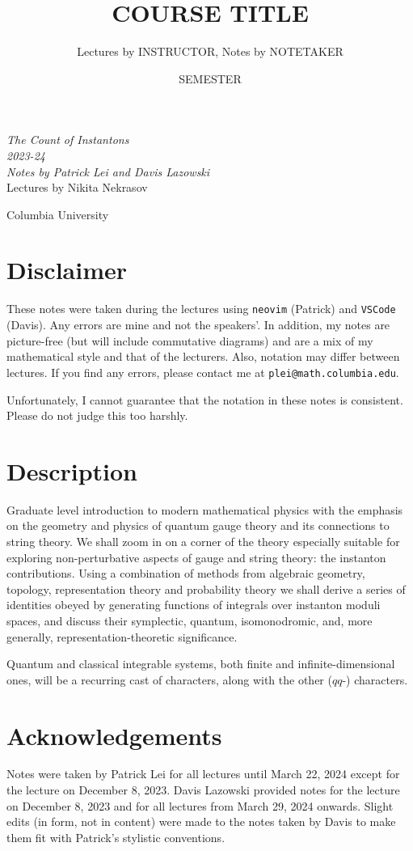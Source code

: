 \documentclass[leqno, openany]{memoir}
\title{COURSE TITLE}
\author{Lectures by INSTRUCTOR, Notes by NOTETAKER}
\date{SEMESTER}
\theoremstyle{definition}
\theoremstyle{remark}
\theoremstyle{plain}
\theoremstyle{definition}
\theoremstyle{remark}
\newcommand*{\titleSW}
    {\begingroup%
    \raggedleft
    \vspace*{\baselineskip}
    {\Huge\itshape The Count of Instantons \\ 2023-24}\\[\baselineskip]
    {\large\itshape Notes by Patrick Lei and Davis Lazowski}\\[0.2\textheight]
    {\Large Lectures by Nikita Nekrasov}\par
    \vfill
    {\Large \sffamily Columbia University}
    \vspace*{\baselineskip}
\endgroup}
\begin{document}
    
\begin{titlingpage}
\titleSW
\end{titlingpage}

\thispagestyle{empty}
\section*{Disclaimer}%
\label{sec:disclaimer}

These notes were taken during the lectures using \texttt{neovim} (Patrick) and \texttt{VSCode} (Davis). 
Any errors are mine and not the speakers'. 
In addition, my notes are picture-free (but will include commutative diagrams) and are a mix of my mathematical style and that of the lecturers. Also, notation may differ between lectures.
If you find any errors, please contact me at \texttt{plei@math.columbia.edu}.

Unfortunately, I cannot guarantee that the notation in these notes is consistent. Please do not judge this too harshly.

\section*{Description}

Graduate level introduction to modern mathematical physics with the emphasis on the geometry and physics of quantum gauge theory and its connections to string theory.  We shall zoom in on a corner of the theory especially suitable for exploring non-perturbative aspects of gauge and string theory: the instanton contributions. Using a combination of methods from algebraic geometry, topology, representation theory and probability theory we shall derive a series of identities obeyed by generating functions of integrals over instanton moduli spaces, and discuss their symplectic, quantum, isomonodromic, and, more generally, representation-theoretic significance.

Quantum and classical integrable systems, both finite and infinite-dimensional ones, will be a recurring cast of characters, along with the other ($qq$-) characters.

\section*{Acknowledgements}
Notes were taken by Patrick Lei for all lectures until March 22, 2024 except for the lecture on December 8, 2023. Davis Lazowski provided notes for the lecture on December 8, 2023 and for all lectures from March 29, 2024 onwards. Slight edits (in form, not in content) were made to the notes taken by Davis to make them fit with Patrick's stylistic conventions.
\end{document}
